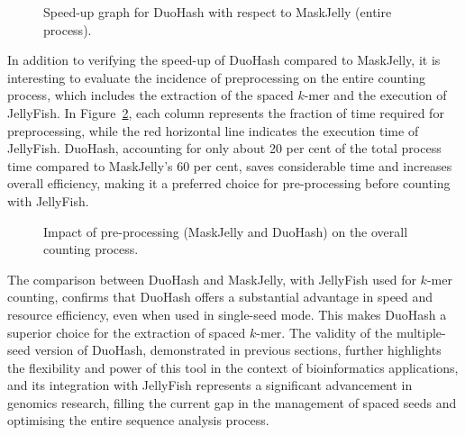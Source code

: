 \begin{figure}[!ht]
	\centering
	\caption{Speed-up graph for DuoHash with respect to MaskJelly (entire process).}
	\label{fig:speedup-total}
\end{figure}



In addition to verifying the speed-up of DuoHash compared to MaskJelly, it is interesting to evaluate the incidence of preprocessing on the entire counting process, which includes the extraction of the spaced $k$-mer and the execution of JellyFish. In Figure~\ref{fig:incidence-on-jellyfish}, each column represents the fraction of time required for preprocessing, while the red horizontal line indicates the execution time of JellyFish. DuoHash, accounting for only about 20 per cent of the total process time compared to MaskJelly's 60 per cent, saves considerable time and increases overall efficiency, making it a preferred choice for pre-processing before counting with JellyFish.

\begin{figure}[!ht]
	\centering
	\caption{Impact of pre-processing (MaskJelly and DuoHash) on the overall counting process.}
	\label{fig:incidence-on-jellyfish}
\end{figure}

The comparison between DuoHash and MaskJelly, with JellyFish used for $k$-mer counting, confirms that DuoHash offers a substantial advantage in speed and resource efficiency, even when used in single-seed mode. This makes DuoHash a superior choice for the extraction of spaced $k$-mer. The validity of the multiple-seed version of DuoHash, demonstrated in previous sections, further highlights the flexibility and power of this tool in the context of bioinformatics applications, and its integration with JellyFish represents a significant advancement in genomics research, filling the current gap in the management of spaced seeds and optimising the entire sequence analysis process.
